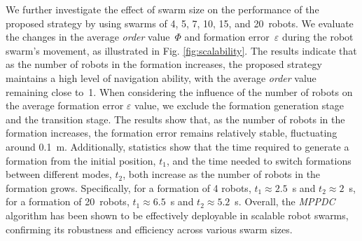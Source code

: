 We further investigate the effect of swarm size on the performance of the proposed strategy by using swarms of 4, 5, 7, 10, 15, and 20~robots. We evaluate the changes in the average \textit{order} value~$\Phi$ and formation error~$\varepsilon$ during the robot swarm's movement, as illustrated in Fig. \ref{fig:scalability}. The results indicate that as the number of robots in the formation increases, the proposed strategy maintains a high level of navigation ability, with the average \textit{order} value remaining close to~1. When considering the influence of the number of robots on the average formation error $\varepsilon$ value, we exclude the formation generation stage and the transition stage. The results show that, as the number of robots in the formation increases, the formation error remains relatively stable, fluctuating around 0.1~m. Additionally, statistics show that the time required to generate a formation from the initial position, $t_1$, and the time needed to switch formations between different modes, $t_2$, both increase as the number of robots in the formation grows. Specifically, for a formation of 4 robots, $t_1 \approx 2.5$~s and $t_2 \approx 2$~s, for a formation of 20~robots, $t_1\approx6.5$~s and $t_2\approx5.2$~s. Overall, the \textit{MPPDC} algorithm has been shown to be effectively deployable in scalable robot swarms, confirming its robustness and efficiency across various swarm sizes.

